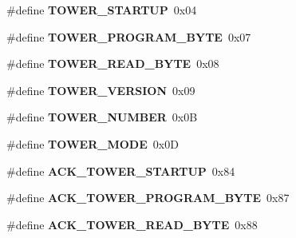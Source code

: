 \begin{DoxyCompactItemize}
\item 
\hypertarget{group__main__module_ga23c90a51db029bf86e8d24b2288b6a85}{}\#define {\bfseries T\+O\+W\+E\+R\+\_\+\+S\+T\+A\+R\+T\+U\+P}~0x04\label{group__main__module_ga23c90a51db029bf86e8d24b2288b6a85}

\item 
\hypertarget{group__main__module_gaffa55faf846d1286510283ea84ac3a2d}{}\#define {\bfseries T\+O\+W\+E\+R\+\_\+\+P\+R\+O\+G\+R\+A\+M\+\_\+\+B\+Y\+T\+E}~0x07\label{group__main__module_gaffa55faf846d1286510283ea84ac3a2d}

\item 
\hypertarget{group__main__module_ga2503c09d0bf9d5213e123d13942c0e1c}{}\#define {\bfseries T\+O\+W\+E\+R\+\_\+\+R\+E\+A\+D\+\_\+\+B\+Y\+T\+E}~0x08\label{group__main__module_ga2503c09d0bf9d5213e123d13942c0e1c}

\item 
\hypertarget{group__main__module_ga26e70c340d201c1d53c5913dc829f9fa}{}\#define {\bfseries T\+O\+W\+E\+R\+\_\+\+V\+E\+R\+S\+I\+O\+N}~0x09\label{group__main__module_ga26e70c340d201c1d53c5913dc829f9fa}

\item 
\hypertarget{group__main__module_ga0e1aaf078379e25e9e3a06d66df0f5b5}{}\#define {\bfseries T\+O\+W\+E\+R\+\_\+\+N\+U\+M\+B\+E\+R}~0x0\+B\label{group__main__module_ga0e1aaf078379e25e9e3a06d66df0f5b5}

\item 
\hypertarget{group__main__module_gaf155bf3eae3a9a7113c7708f69d73495}{}\#define {\bfseries T\+O\+W\+E\+R\+\_\+\+M\+O\+D\+E}~0x0\+D\label{group__main__module_gaf155bf3eae3a9a7113c7708f69d73495}

\item 
\hypertarget{group__main__module_ga4017b63a192d47b63a741136f2bac1ca}{}\#define {\bfseries A\+C\+K\+\_\+\+T\+O\+W\+E\+R\+\_\+\+S\+T\+A\+R\+T\+U\+P}~0x84\label{group__main__module_ga4017b63a192d47b63a741136f2bac1ca}

\item 
\hypertarget{group__main__module_ga49c745f1227d104a1d24d6975c049b54}{}\#define {\bfseries A\+C\+K\+\_\+\+T\+O\+W\+E\+R\+\_\+\+P\+R\+O\+G\+R\+A\+M\+\_\+\+B\+Y\+T\+E}~0x87\label{group__main__module_ga49c745f1227d104a1d24d6975c049b54}

\item 
\hypertarget{group__main__module_ga383ace3a6fd509ff38ef123a4af00350}{}\#define {\bfseries A\+C\+K\+\_\+\+T\+O\+W\+E\+R\+\_\+\+R\+E\+A\+D\+\_\+\+B\+Y\+T\+E}~0x88\label{group__main__module_ga383ace3a6fd509ff38ef123a4af00350}


\end{DoxyCompactItemize}
